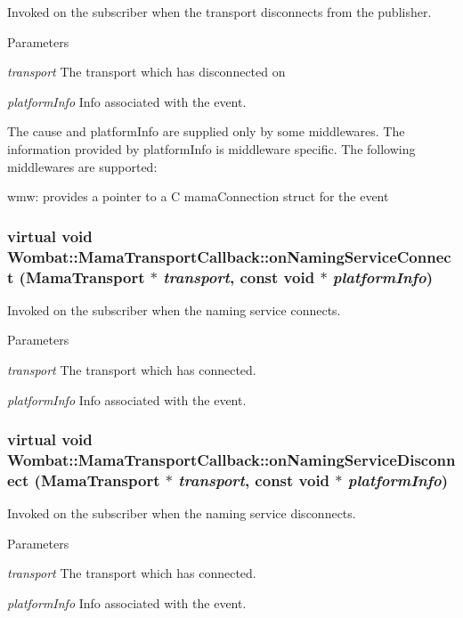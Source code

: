 Invoked on the subscriber when the transport disconnects from the publisher. 
\begin{DoxyParams}{Parameters}
\item[{\em transport}]The transport which has disconnected on \item[{\em platformInfo}]Info associated with the event.\end{DoxyParams}
The cause and platformInfo are supplied only by some middlewares. The information provided by platformInfo is middleware specific. The following middlewares are supported:

wmw: provides a pointer to a C mamaConnection struct for the event \hypertarget{classWombat_1_1MamaTransportCallback_a3ad4489dd4e812423d6e2447cae75da9}{
\subsubsection[{onNamingServiceConnect}]{\setlength{\rightskip}{0pt plus 5cm}virtual void Wombat::MamaTransportCallback::onNamingServiceConnect ({\bf MamaTransport} $\ast$ {\em transport}, \/  const void $\ast$ {\em platformInfo})}}
\label{classWombat_1_1MamaTransportCallback_a3ad4489dd4e812423d6e2447cae75da9}


Invoked on the subscriber when the naming service connects. 
\begin{DoxyParams}{Parameters}
\item[{\em transport}]The transport which has connected. \item[{\em platformInfo}]Info associated with the event. \end{DoxyParams}
\hypertarget{classWombat_1_1MamaTransportCallback_a51db398120915d5115e7c6be661e51c7}{
\subsubsection[{onNamingServiceDisconnect}]{\setlength{\rightskip}{0pt plus 5cm}virtual void Wombat::MamaTransportCallback::onNamingServiceDisconnect ({\bf MamaTransport} $\ast$ {\em transport}, \/  const void $\ast$ {\em platformInfo})}}
\label{classWombat_1_1MamaTransportCallback_a51db398120915d5115e7c6be661e51c7}


Invoked on the subscriber when the naming service disconnects. 
\begin{DoxyParams}{Parameters}
\item[{\em transport}]The transport which has connected. \item[{\em platformInfo}]Info associated with the event. \end{DoxyParams}
